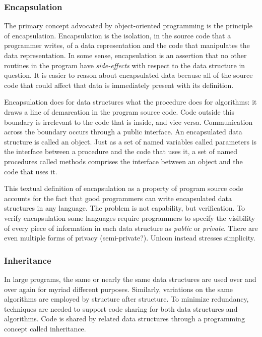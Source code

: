 \subsubsection{Encapsulation}

The primary concept advocated by object-oriented programming is the
principle of encapsulation. Encapsulation is the
isolation, in the source code that a programmer writes, of a data
representation and the code that manipulates the data representation.
In some sense, encapsulation is an assertion that no other routines in
the program have {\em side-effects\/} with
respect to the data structure in question. It is easier to reason about
encapsulated data because all of the source code that could affect that
data is immediately present with its definition. 

Encapsulation does for data structures what the procedure does for
algorithms: it draws a line of demarcation in the program source code.
Code outside this boundary is irrelevant to
the code that is inside, and vice versa. Communication across the
boundary occurs through a public interface. An encapsulated
data structure is called an object. Just as a set of named variables called
parameters is the interface between a procedure and the
code that uses it, a set of named procedures called methods comprises
the interface between an object and the code that uses it. 

This textual definition of encapsulation as a property of program source
code accounts for the fact that good programmers can write encapsulated
data structures in any language. The problem is not capability, but
verification. To verify encapsulation some languages require
programmers to specify the visibility of every piece of information in
each data structure as {\em public\/} or
{\em private\/}. There are even multiple forms of
privacy (semi-private?). Unicon instead stresses simplicity. 

\subsubsection{Inheritance}

In large programs, the same or nearly the same data structures are used
over and over again for myriad different purposes. Similarly,
variations on the same algorithms are employed by structure after
structure. To minimize redundancy, techniques are needed to support
code sharing for both data structures and algorithms. Code is shared by
related data structures through a programming concept called
inheritance. 


